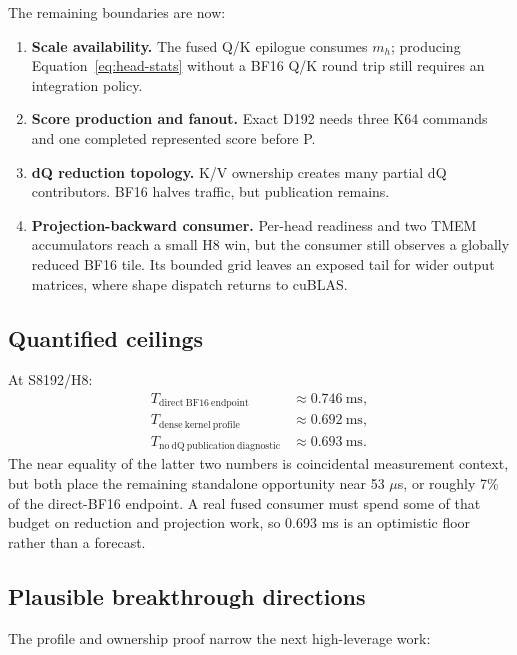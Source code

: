 The remaining boundaries are now:

\begin{enumerate}
  \item \textbf{Scale availability.}  The fused Q/K epilogue consumes
  $m_h$; producing Equation~\ref{eq:head-stats} without a BF16 Q/K round trip
  still requires an integration policy.
  \item \textbf{Score production and fanout.}  Exact D192 needs three K64
  commands and one completed represented score before P.
  \item \textbf{dQ reduction topology.}  K/V ownership creates many partial
  dQ contributors.  BF16 halves traffic, but publication remains.
  \item \textbf{Projection-backward consumer.}  Per-head readiness and two
  TMEM accumulators reach a small H8 win, but the consumer still observes a
  globally reduced BF16 tile.  Its bounded grid leaves an exposed tail for
  wider output matrices, where shape dispatch returns to cuBLAS.
\end{enumerate}

\subsection{Quantified ceilings}

At S8192/H8:
\begin{align}
  T_{\mathrm{direct\ BF16\ endpoint}} &\approx 0.746\ \mathrm{ms},\\
  T_{\mathrm{dense\ kernel\ profile}} &\approx 0.692\ \mathrm{ms},\\
  T_{\mathrm{no\ dQ\ publication\ diagnostic}} &\approx 0.693\ \mathrm{ms}.
  \label{eq:current-ceilings}
\end{align}
The near equality of the latter two numbers is coincidental measurement
context, but both place the remaining standalone opportunity near 53
$\mu$s, or roughly 7\% of the direct-BF16 endpoint.  A real fused consumer
must spend some of that budget on reduction and projection work, so 0.693 ms
is an optimistic floor rather than a forecast.

\subsection{Plausible breakthrough directions}

The profile and ownership proof narrow the next high-leverage work:

